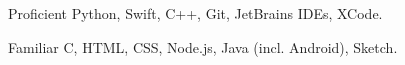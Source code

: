 
\begin{cvskills}

	\cvskill
	{Proficient} %
	{Python, Swift, C++, Git, JetBrains IDEs, XCode.} %

	\cvskill
	{Familiar\hphantom{9} } %
	{C, HTML, CSS, Node.js, Java (incl. Android), Sketch.} %


    

\end{cvskills}

